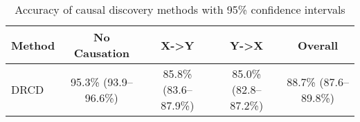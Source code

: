 \begin{table}[htbp]
\centering
\caption{Accuracy of causal discovery methods with 95\% confidence intervals}
\begin{tabular}{lcccc}
\toprule
Method & No Causation & X->Y & Y->X & Overall \\
\midrule
DRCD & 95.3\% (93.9--96.6\%) & 85.8\% (83.6--87.9\%) & 85.0\% (82.8--87.2\%) & 88.7\% (87.6--89.8\%) \\
\bottomrule
\end{tabular}
\label{tab:accuracy_results}
\end{table}

